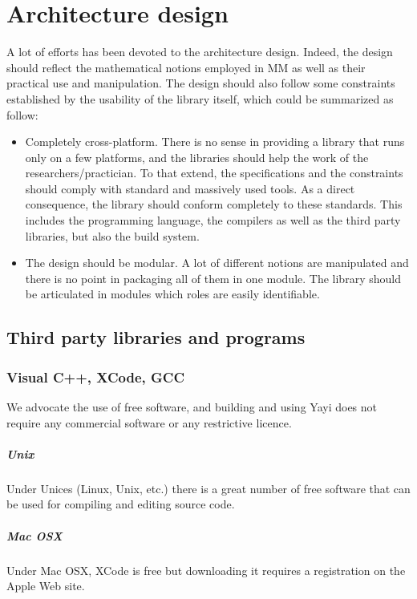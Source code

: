 \chapter{Architecture design}
A lot of efforts has been devoted to the architecture design. Indeed, the design should reflect the mathematical notions employed in MM as well as their practical use and manipulation. The design should also follow some constraints established by the usability of the library itself, which could be summarized as follow:
\begin{itemize}
\item Completely cross-platform. There is no sense in providing a library that runs only on a few platforms, and the libraries should help the work of the researchers/practician. To that extend, the specifications and the constraints should comply with standard and massively used tools. As a direct consequence, the library should conform completely to these standards. This includes the programming language, the compilers as well as the third party libraries, but also the build system.
\item The design should be modular. A lot of different notions are manipulated and there is no point in packaging all of them in one module. The library should be articulated in modules which roles are easily identifiable. 
\end{itemize}


\section{Third party libraries and programs}

\subsection{Visual C++, XCode, GCC}
We advocate the use of free software, and building and using Yayi does not require any commercial software or any restrictive licence. 

\paragraph{Unix} Under Unices (Linux, Unix, etc.) there is a great number of free software that can be used for compiling and editing source code. 
\paragraph{Mac OSX} Under Mac OSX, XCode is free but downloading it requires a registration on the Apple Web site. 
